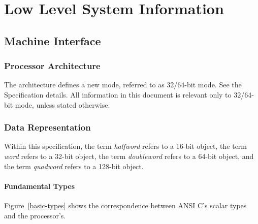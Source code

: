
\chapter{Low Level System Information}

\section{Machine Interface}

\subsection{Processor Architecture}

The \xARCH architecture defines a new mode, referred to as 32/64-bit
mode. See the \xARCH Specification details. All information in this
document is relevant only to 32/64-bit mode, unless stated otherwise.


\subsection{Data Representation}

Within this specification, the term \emph{halfword} refers to a 16-bit
object, the term \emph{word} refers to a 32-bit object, the term
\emph{doubleword} refers to a 64-bit object, and the term
\emph{quadword} refers to a 128-bit object.

\subsubsection{Fundamental Types}

Figure~\ref{basic-types} shows the correspondence between ANSI C's
scalar types and the processor's.

